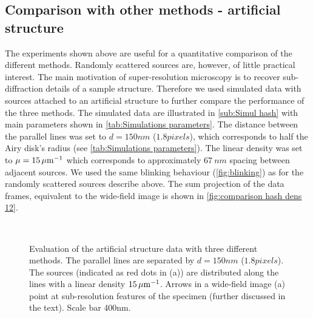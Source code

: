 \subsection{Comparison with other methods - artificial structure\label{sub:results - comparison - structure}}
The experiments shown above are useful for a quantitative comparison of the different methods. Randomly scattered sources are, however, of little practical interest. The main motivation of super-resolution microscopy is to recover sub-diffraction details of a sample structure. Therefore we used simulated data with sources attached to an artificial structure to further compare the performance of the three methods. The simulated data are illustrated in \autoref{sub:Simul hash} with main parameters shown in \autoref{tab:Simulations parameters}. The distance between the parallel lines was set to $d=150\unit{nm}$ ($1.8 \unit{pixels}$), which corresponds to half the Airy disk's radius (see \autoref{tab:Simulations parameters}). The linear density was set to $\mu = 15\, \mathrm{\mu m}^{-1}$ which corresponds to approximately $67\ \unit{nm}$ spacing between adjacent sources. We used the same blinking behaviour (\autoref{fig:blinking}\ddd) as for the randomly scattered sources describe above. The sum projection of the data frames, equivalent to the wide-field image is shown in \autoref{fig:comparison hash dens 12}\aaa.
%
\begin{figure}[!h]
	\centering
	\newcommand{\sizef}{.95}
	\newcommand{\wf}{.45\textwidth}
	\\
	\caption{Evaluation of the artificial structure data with three different methods. The parallel lines are separated by $d=150 \unit{nm}$ ($1.8 \unit{pixels}$). The sources (indicated as red dots in (a)) are distributed along the lines with a linear density $15 \, \mathrm{\mu m}^{-1}$. Arrows in a wide-field image (a) point at sub-resolution features of the specimen (further discussed in the text). Scale bar 400\unit{nm}.}
	\label{fig:comparison hash dens 12}
\end{figure}
%

